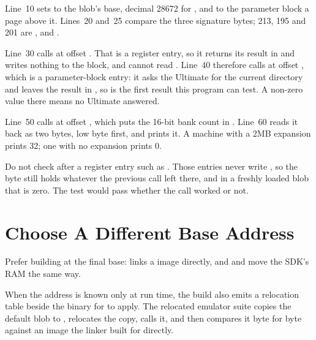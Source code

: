 Line~10 sets  to the blob's base, decimal 28672 for , and
 to the parameter block a page above it. Lines~20 and~25 compare the
three signature bytes; 213, 195 and 201 are ,  and
.

Line~30 calls  at offset . That is a register
entry, so it returns its result in  and writes nothing to the block,
and  cannot read . Line~40 therefore calls  at
offset , which is a parameter-block entry: it asks the Ultimate for
the current directory and leaves the result in , so
 is the first result this program can test. A non-zero value
there means no Ultimate answered.

Line~50 calls  at offset , which puts the 16-bit bank
count in . Line~60 reads it back as two bytes, low byte first, and
prints it. A machine with a 2MB expansion prints 32; one with no expansion
prints 0.

\begin{warning}
Do not check  after a register entry such as . Those
entries never write , so the byte still holds whatever the
previous call left there, and in a freshly loaded blob that is zero. The test
would pass whether the call worked or not.
\end{warning}


\section{Choose A Different Base Address}

Prefer building at the final base:  links
a  image directly, and  and  move the SDK's RAM
the same way.

When the address is known only at run time, the build also emits a relocation
table beside the binary for  to apply. The relocated emulator
suite copies the default blob to , relocates the copy, calls it,
and then compares it byte for byte against an image the linker built for
 directly.

